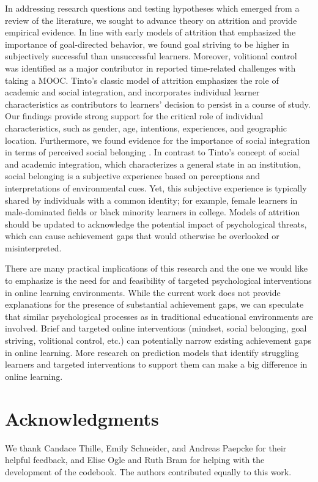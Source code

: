 \documentclass{sigchi}\usepackage[]{graphicx}\usepackage[]{color}
\begin{document}
In addressing research questions and testing hypotheses which emerged from a review of the literature, we sought to advance theory on attrition and provide empirical evidence. In line with early models of attrition that emphasized the importance of goal-directed behavior, we found goal striving to be higher in subjectively successful than unsuccessful learners. Moreover, volitional control was identified as a major contributor in reported time-related challenges with taking a MOOC. Tinto's \cite{tinto1975dropout} classic model of attrition emphasizes the role of academic and social integration, and incorporates individual learner characteristics as contributors to learners' decision to persist in a course of study. Our findings provide strong support for the critical role of individual characteristics, such as gender, age, intentions, experiences, and geographic location. Furthermore, we found evidence for the importance of social integration in terms of perceived social belonging \cite{walton2007question}. In contrast to Tinto's concept of social and academic integration, which characterizes a general state in an institution, social belonging is a subjective experience based on perceptions and interpretations of environmental cues. Yet, this subjective experience is typically shared by individuals with a common identity; for example,  female learners in male-dominated fields or black minority learners in college. Models of attrition should be updated to acknowledge the potential impact of psychological threats, which can cause achievement gaps that would otherwise be overlooked or misinterpreted. 

There are many practical implications of this research and the one we would like to emphasize is the need for and feasibility of targeted psychological interventions in online learning environments. While the current work does not provide explanations for the presence of substantial achievement gaps, we can speculate that similar psychological processes as in traditional educational environments are involved. Brief and targeted online interventions (mindset, social belonging, goal striving, volitional control, etc.) can potentially narrow existing achievement gaps in online learning. More research on prediction models that identify struggling learners and targeted interventions to support them can make a big difference in online learning.


\section{Acknowledgments}
We thank Candace Thille, Emily Schneider, and Andreas Paepcke for their helpful feedback, and Elise Ogle and Ruth Bram for helping with the development of the codebook. The authors contributed equally to this work.
\end{document}
